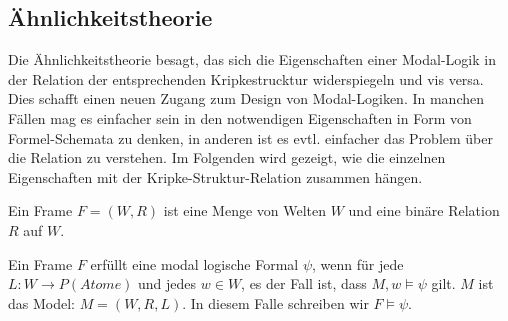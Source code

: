 
\subsection{Ähnlichkeitstheorie} %
\label{sub:Aehnlichkeitstheorie}

Die Ähnlichkeitstheorie besagt, das sich die Eigenschaften einer Modal-Logik in der Relation der entsprechenden Kripkestrucktur widerspiegeln und vis versa. 
Dies schafft einen neuen Zugang zum Design von Modal-Logiken. 
In manchen Fällen mag es einfacher sein in den notwendigen Eigenschaften in Form von Formel-Schemata zu denken, in anderen ist es evtl. einfacher das Problem über die Relation zu verstehen. 
Im Folgenden wird gezeigt, wie die einzelnen Eigenschaften mit der Kripke-Struktur-Relation zusammen hängen.

\begin{definition}
	\label{def:frame}
	Ein Frame $F = (W,R)$ ist eine Menge von Welten $W$ und eine binäre Relation $R$ auf $W$.
\end{definition}
\cite[S.322]{huth2004logic}


\begin{definition}
	\label{def:frame_erfuellt}
	Ein Frame $F$ erfüllt eine modal logische Formal $\psi$, wenn für jede  $L: W \rightarrow P(Atome)$ und jedes $w \in W$, es der Fall ist, dass $M,w \vDash \psi$ gilt. $M$ ist das Model: $M = (W,R,L)$.
	In diesem Falle schreiben wir $F \vDash \psi$.
\end{definition}
\cite[S.322f]{huth2004logic}






